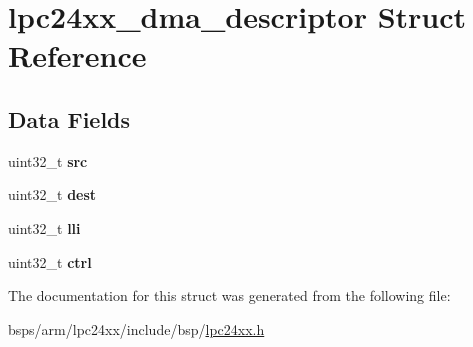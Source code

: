 \hypertarget{structlpc24xx__dma__descriptor}{}\section{lpc24xx\+\_\+dma\+\_\+descriptor Struct Reference}
\label{structlpc24xx__dma__descriptor}
\subsection*{Data Fields}
\begin{DoxyCompactItemize}
\item 
\mbox{\label{structlpc24xx__dma__descriptor_abcdbf3c68a833e24c59b1504049d4a5f}} 
uint32\+\_\+t {\bfseries src}
\item 
\mbox{\label{structlpc24xx__dma__descriptor_aead9fe656cee4ff0f62968b80dd640df}} 
uint32\+\_\+t {\bfseries dest}
\item 
\mbox{\label{structlpc24xx__dma__descriptor_a4d238c9a4725f6bd921e89ce7d496612}} 
uint32\+\_\+t {\bfseries lli}
\item 
\mbox{\label{structlpc24xx__dma__descriptor_af9bd6d05f683192321747fba21ed2144}} 
uint32\+\_\+t {\bfseries ctrl}
\end{DoxyCompactItemize}


The documentation for this struct was generated from the following file\+:\begin{DoxyCompactItemize}
\item 
bsps/arm/lpc24xx/include/bsp/\mbox{\hyperlink{lpc24xx_8h}{lpc24xx.\+h}}\end{DoxyCompactItemize}
